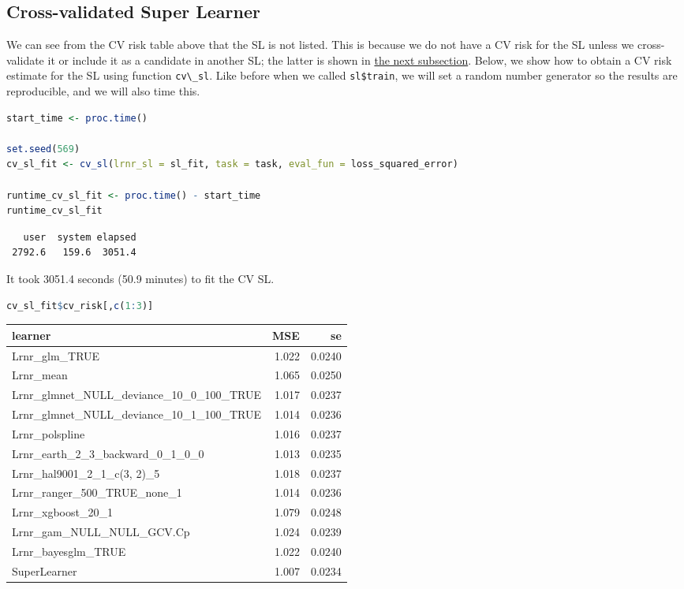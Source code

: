 \documentclass[
  12pt, krantz2,
]{krantz}
\newcommand{\passthrough}[1]{#1}
\newcommand{\1}{\mathbbm{1}}
\theoremstyle{definition}
\theoremstyle{definition}
\theoremstyle{definition}
\theoremstyle{definition}
\theoremstyle{remark}
\begin{document}
\hypertarget{cross-validated-super-learner}{%
\subsection{Cross-validated Super Learner}\label{cross-validated-super-learner}}

We can see from the CV risk table above that the SL is not listed. This is
because we do not have a CV risk for the SL unless we cross-validate it or
include it as a candidate in another SL; the latter is shown in \href{https://tlverse.org/tlverse-handbook/sl3.html\#discrete-super-learner}{the next
subsection}.
Below, we show how to obtain a CV risk estimate for the SL using function
\passthrough{\lstinline!cv\_sl!}. Like before when we called \passthrough{\lstinline!sl$train!}, we will set a random number
generator so the results are reproducible, and we will also time this.

\begin{lstlisting}[language=R]
start_time <- proc.time()

set.seed(569)
cv_sl_fit <- cv_sl(lrnr_sl = sl_fit, task = task, eval_fun = loss_squared_error)

runtime_cv_sl_fit <- proc.time() - start_time
runtime_cv_sl_fit
\end{lstlisting}

\begin{lstlisting}
   user  system elapsed 
 2792.6   159.6  3051.4 
\end{lstlisting}

It took 3051.4 seconds (50.9 minutes) to fit the CV SL.

\begin{lstlisting}[language=R]
cv_sl_fit$cv_risk[,c(1:3)]
\end{lstlisting}

\begin{tabular}{l|r|r}
\hline
learner & MSE & se\\
\hline
Lrnr\_glm\_TRUE & 1.022 & 0.0240\\
\hline
Lrnr\_mean & 1.065 & 0.0250\\
\hline
Lrnr\_glmnet\_NULL\_deviance\_10\_0\_100\_TRUE & 1.017 & 0.0237\\
\hline
Lrnr\_glmnet\_NULL\_deviance\_10\_1\_100\_TRUE & 1.014 & 0.0236\\
\hline
Lrnr\_polspline & 1.016 & 0.0237\\
\hline
Lrnr\_earth\_2\_3\_backward\_0\_1\_0\_0 & 1.013 & 0.0235\\
\hline
Lrnr\_hal9001\_2\_1\_c(3, 2)\_5 & 1.018 & 0.0237\\
\hline
Lrnr\_ranger\_500\_TRUE\_none\_1 & 1.014 & 0.0236\\
\hline
Lrnr\_xgboost\_20\_1 & 1.079 & 0.0248\\
\hline
Lrnr\_gam\_NULL\_NULL\_GCV.Cp & 1.024 & 0.0239\\
\hline
Lrnr\_bayesglm\_TRUE & 1.022 & 0.0240\\
\hline
SuperLearner & 1.007 & 0.0234\\
\hline
\end{tabular}
\end{document}
